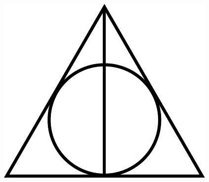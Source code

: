\vspace*{\fill}
{
\begin{center}
\includegraphics[scale=0.75]{Deathly_Hallows_Sign.pdf}
\end{center}
}
\vspace*{\fill}
\clearpage

